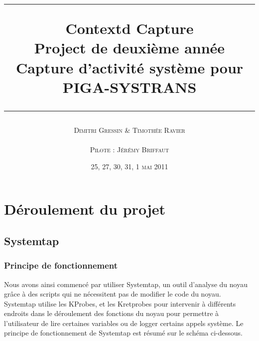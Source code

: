 \documentclass[pdftex,a4paper,titlepage,11pt,openright]{article}
\newcommand{\nom}[1]{\textsc{#1}}
\newcommand{\ligne}[1][1pt]{
  \par\noindent
  \rule[.5ex]{\linewidth}{#1}\par}
\newcommand{\clearemptydoublepage}{
	\newpage{\pagestyle{empty}\cleardoublepage}}
\begin{document}
\setlength{\parskip}{2.4ex}

\title{
\ligne{\Large}
\textbf{Contextd Capture}\\
\textbf{Project de deuxième année}\\
\Large Capture d'activité système pour PIGA-SYSTRANS
\ligne{\Large}
}
\author{\nom{Dimitri Gressin} \& \nom{Timothée Ravier}\\\\\nom{Pilote : Jérémy Briffaut}}
\date{25, 27, 30, 31, 1 \textsc{mai} 2011} %

\maketitle

\clearemptydoublepage

\setcounter{secnumdepth}{3}
\setcounter{tocdepth}{2}
\tableofcontents
\addtocounter{page}{-1}

\newpage



\newpage



\newpage



\newpage

\section{Déroulement du projet}

\subsection{Systemtap}

\subsubsection{Principe de fonctionnement}

Nous avons ainsi commencé par utiliser Systemtap, un outil d'analyse du noyau grâce à des scripts qui ne nécessitent pas de modifier le code du noyau. Systemtap utilise les KProbes, et les Kretprobes\cite{IBMRBST} pour intervenir à différents endroits dans le déroulement des fonctions du noyau pour permettre à l'utilisateur de lire certaines variables ou de logger certains appels système. Le principe de fonctionnement de Systemtap est résumé sur le schéma ci-dessous.
\end{document}
